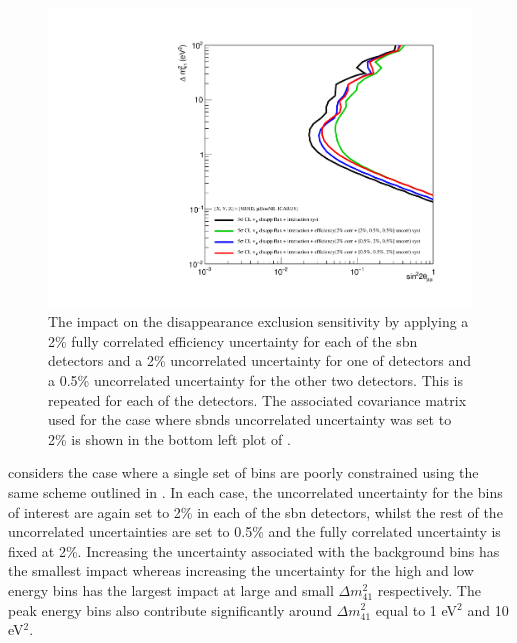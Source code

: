 \begin{figure}[!h]
    \centering
    \includegraphics[width = \largefigwidth]{figures-chap6/exclusion_contours/efficiency_systematics/numu_disapp_2pct_cor_2pct_X_05pct_other_per_detector_uncor.pdf}
    \caption[Impact of a 2\% uncorrelated efficiency systematic for one detector and 0.5\% for the other two on the \numu disappearance channel.]{The impact on the \numu disappearance exclusion sensitivity by applying a 2\% fully correlated efficiency uncertainty for each of the \gls{sbn} detectors and a 2\% uncorrelated uncertainty for one of detectors and a 0.5\% uncorrelated uncertainty for the other two detectors. This is repeated for each of the detectors. The associated covariance matrix used for the case where \glspl{sbnd} uncorrelated uncertainty was set to 2\% is shown in the bottom left plot of .}
    \label{fig:numu_uncorr}
\end{figure}

\newpage
 considers the case where a single set of bins are poorly constrained using the same scheme outlined in . In each case, the uncorrelated uncertainty for the bins of interest are again set to 2\% in each of the \gls{sbn} detectors, whilst the rest of the uncorrelated uncertainties are set to 0.5\% and the fully correlated uncertainty is fixed at 2\%. Increasing the uncertainty associated with the background bins has the smallest impact whereas increasing the uncertainty for the high and low energy bins has the largest impact at large and small $\Delta m^2_{41}$ respectively. The peak energy bins also contribute significantly around $\Delta m^2_{41}$ equal to 1 eV$^2$ and 10 eV$^2$. 


